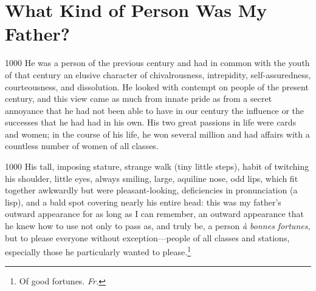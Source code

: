 \chapter{What Kind of Person Was My Father?} %

\begin{tolerant}{1000}
He was a person of the previous century and had in common with the youth of that century an elusive character of chivalrousness, intrepidity, self-assuredness, courteousness, and dissolution. He looked with contempt on people of the present century, and this view came as much from innate pride as from a secret annoyance that he had not been able to have in our century the influence or the successes that he had had in his own. His two great passions in life were cards and women; in the course of his life, he won several million and had affairs with a countless number of women of all classes.
\end{tolerant}

\begin{tolerant}{1000}
His tall, imposing stature, strange walk (tiny little steps), habit of twitching his shoulder, little eyes, always smiling, large, aquiline nose, odd lips, which fit together awkwardly but were pleasant-looking, deficiencies in pronunciation (a lisp), and a bald spot covering nearly his entire head: this was my father's outward appearance for as long as I can remember, an outward appearance that he knew how to use not only to pass as, and truly be, a person \textit{\`a bonnes fortunes,} but to please everyone without exception---people of all classes and stations, especially those he particularly wanted to please.\footnote{Of good fortunes. \textit{Fr.}}
\end{tolerant}

